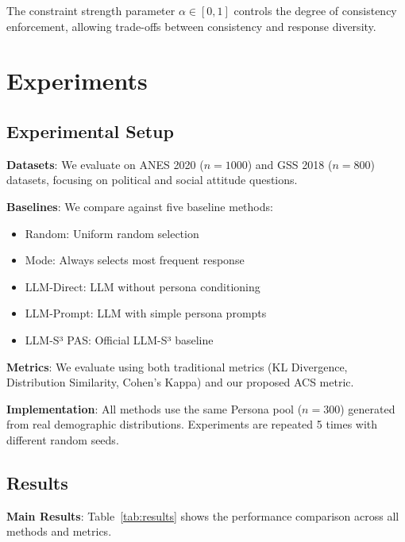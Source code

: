 \documentclass{article}
\begin{document}
The constraint strength parameter $\alpha \in [0,1]$ controls the degree of consistency enforcement, allowing trade-offs between consistency and response diversity.

\section{Experiments}

\subsection{Experimental Setup}

\textbf{Datasets}: We evaluate on ANES 2020 ($n=1000$) and GSS 2018 ($n=800$) datasets, focusing on political and social attitude questions.

\textbf{Baselines}: We compare against five baseline methods:
\begin{itemize}
    \item Random: Uniform random selection
    \item Mode: Always selects most frequent response
    \item LLM-Direct: LLM without persona conditioning
    \item LLM-Prompt: LLM with simple persona prompts
    \item LLM-S³ PAS: Official LLM-S³ baseline
\end{itemize}

\textbf{Metrics}: We evaluate using both traditional metrics (KL Divergence, Distribution Similarity, Cohen's Kappa) and our proposed ACS metric.

\textbf{Implementation}: All methods use the same Persona pool ($n=300$) generated from real demographic distributions. Experiments are repeated 5 times with different random seeds.

\subsection{Results}

\textbf{Main Results}: Table~\ref{tab:results} shows the performance comparison across all methods and metrics.
\end{document}
